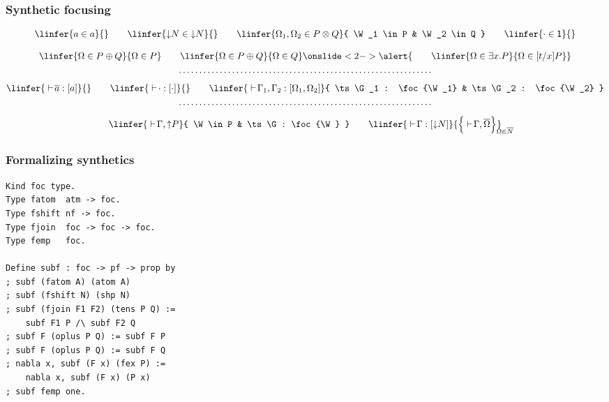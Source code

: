 \documentclass{beamer}
\begin{document}
\begin{frame}
  \frametitle{Synthetic focusing}

  \begin{gather*}
    \linfer{
      a \in a \mathstrut
    }{}
    \qquad
    \linfer{
      \SHP N \in \SHP N
    }{}
    \qquad
    \linfer{
      \W_1, \W_2 \in P \TENS Q
    }{
      \W_1 \in P & \W_2 \in Q
    }
    \qquad
    \linfer{
      \cdot \in \ONE
    }{}
    \\[2ex]
    \linfer{
      \W \in P \PLUS Q
    }{
      \W \in P
    }
    \qquad
    \linfer{
      \W \in P \PLUS Q
    }{
      \W \in Q
    }
\onslide<2->{\alert{
    \qquad
    \linfer{
      \W \in \exists x. P
    }{
      \W \in [t/x] P
    }
}}
    \\
    \hbox to .8\linewidth{\dotfill}
    \\[1ex]
    \linfer{
      \ts \dual a : \foc{a}
    }{}
    \qquad
    \linfer{
      \ts \cdot : \foc{\cdot}
    }{}
    \qquad
    \linfer{
      \ts \G_1, \G_2 : \foc{\W_1, \W_2}
    }{
      \ts \G_1 : \foc{\W_1}
      &
      \ts \G_2 : \foc{\W_2}
    }
    \\
    \hbox to .8\linewidth{\dotfill}
    \\[1ex]
    \linfer{
      \ts \G, \SHN P
    }{
      \W \in P & \ts \G : \foc{\W}
    }
    \qquad
    \linfer{
      \ts \G : \foc{\SHP N}
    }{
      \Bigl\{{
        \ts \G, \dual \W
      }\Bigr\}_{\mathrlap{\W \in \dual N}}
    }
  \end{gather*}
\end{frame}

\begin{frame}[fragile]
  \frametitle{Formalizing synthetics}

\begin{lstlisting}
Kind foc type.
Type fatom  atm -> foc.
Type fshift nf -> foc.
Type fjoin  foc -> foc -> foc.
Type femp   foc.

Define subf : foc -> pf -> prop by
; subf (fatom A) (atom A)
; subf (fshift N) (shp N)
; subf (fjoin F1 F2) (tens P Q) :=
    subf F1 P /\ subf F2 Q
; subf F (oplus P Q) := subf F P
; subf F (oplus P Q) := subf F Q
; nabla x, subf (F x) (fex P) :=
    nabla x, subf (F x) (P x)
; subf femp one.
\end{lstlisting}
\end{frame}
\end{document}
